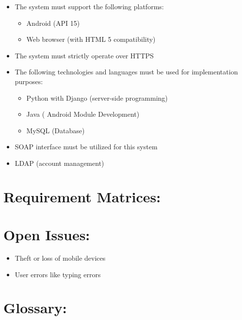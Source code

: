 \documentclass[12pt]{article}
\begin{document}
		\begin{itemize}
			\item The system must support the following platforms: 
				\begin{itemize}
					\item Android (API 15)
					\item Web browser (with HTML 5 compatibility)
				\end{itemize}
				
			\item The system must strictly operate over HTTPS
			\item The following technologies and languages must be used for implementation purposes:
				\begin{itemize}
					\item Python with Django (server-side programming)
					\item Java ( Android Module Development)
					\item MySQL (Database)
				\end{itemize}
				\item SOAP interface must be utilized for this system
				\item LDAP (account management)
		\end{itemize}
	
	\vspace{0.5in}
	
	\newpage
	\section{Requirement Matrices:}
	\vspace{0.2in}
	
	
	
	\vspace{0.5in}
	
	\section{Open Issues:} %
	\vspace{0.2in}
	
	\begin{itemize}
		\item Theft or loss of mobile devices
		\item User errors like typing errors
	\end{itemize}
	
	
	\vspace{0.5in}
	
	\section{Glossary:}
	\vspace{0.2in}
		
	
	\vspace{0.5in}
		
\end{document}
